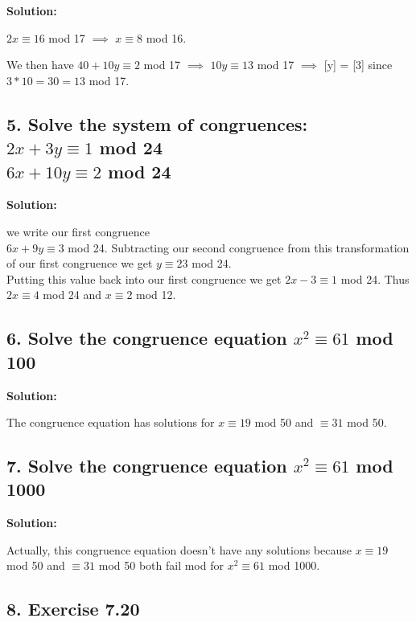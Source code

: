 \documentclass{article}
\begin{document}
\begin{spacing}{1.1}
\textbf{Solution: }

$2x \equiv 16$ mod 17 $\implies$ $x \equiv 8$ mod 16.  

We then have $40 + 10y \equiv 2$ mod 17 $\implies$ $10y \equiv 13$ mod 17 $\implies$ [y] = [3] since $3 * 10 = 30 = 13$ mod 17.  


\vfill

\subsection{5.  Solve the system of congruences: 
\\$ 2x + 3y \equiv 1$ mod 24
\\$ 6x + 10y \equiv 2$ mod 24}

\textbf{Solution: }

we write our first congruence
\\$6x + 9y \equiv 3$ mod 24.  Subtracting our second congruence from this transformation of our first congruence we get $y \equiv 23$ mod 24.  
\\Putting this value back into our first congruence we get $2x - 3 \equiv 1$ mod 24.  Thus $2x \equiv 4$ mod 24 and $x \equiv 2$ mod 12.  

\vfill

\subsection{6.  Solve the congruence equation $x^2 \equiv 61$ mod 100}

\textbf{Solution: }

The congruence equation has solutions for $x \equiv 19$ mod 50 and $ \equiv 31$ mod 50.  

\vfill

\subsection{7.  Solve the congruence equation $x^2 \equiv 61$ mod 1000}

\textbf{Solution: }

Actually, this congruence equation doesn't have any solutions because $x \equiv 19$ mod 50 and $ \equiv 31$ mod 50 both fail mod for  $x^2 \equiv 61$ mod 1000.  

\vfill

\subsection{8.  Exercise 7.20}


\end{spacing}
\end{document}
